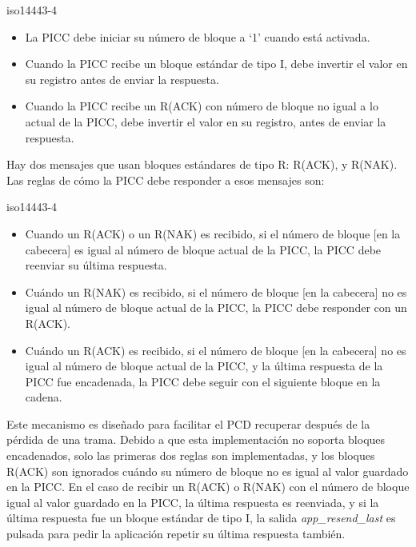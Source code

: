 \documentclass[a4paper, twoside, 11pt]{report}
\begin{document}
\begin{displaycquote}[traducido de][]{iso14443-4}
  \begin{itemize}
    \item La PICC debe iniciar su número de bloque a ‘1’ cuando está activada.
    \item Cuando la PICC recibe un bloque estándar de tipo I, debe invertir el valor en su registro antes de enviar la respuesta.
    \item Cuando la PICC recibe un R(ACK) con número de bloque no igual a lo actual de la PICC, debe invertir el valor en su registro, antes de enviar la respuesta.
  \end{itemize}
\end{displaycquote}

Hay dos mensajes que usan bloques estándares de tipo R: R(ACK), y R(NAK). Las reglas de cómo la PICC debe responder a esos mensajes son:

\begin{displaycquote}[traducido de][]{iso14443-4}
  \begin{itemize}
    \item Cuando un R(ACK) o un R(NAK) es recibido, si el número de bloque [en la cabecera] es igual al número de bloque actual de la PICC, la PICC debe reenviar su última respuesta.
    \item Cuándo un R(NAK) es recibido, si el número de bloque [en la cabecera] no es igual al número de bloque actual de la PICC, la PICC debe responder con un R(ACK).
    \item Cuándo un R(ACK) es recibido, si el número de bloque [en la cabecera] no es igual al número de bloque actual de la PICC, y la última respuesta de la PICC fue encadenada, la PICC debe seguir con el siguiente bloque en la cadena.
  \end{itemize}
\end{displaycquote}

Este mecanismo es diseñado para facilitar el PCD recuperar después de la pérdida de una trama. Debido a que esta implementación no soporta bloques encadenados, solo las primeras dos reglas son implementadas, y los bloques R(ACK) son ignorados cuándo su número de bloque no es igual al valor guardado en la PICC. En el caso de recibir un R(ACK) o R(NAK) con el número de bloque igual al valor guardado en la PICC, la última respuesta es reenviada, y si la última respuesta fue un bloque estándar de tipo I, la salida \textit{app\_resend\_last} es pulsada para pedir la aplicación repetir su última respuesta también.
\end{document}

